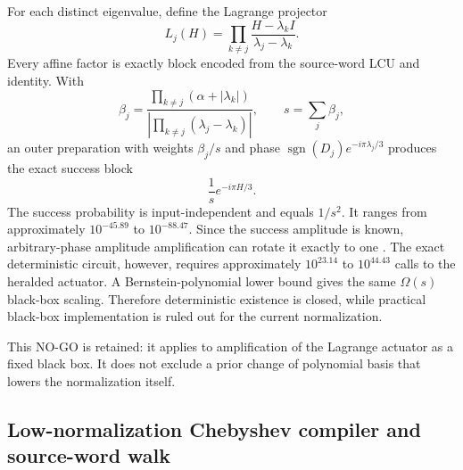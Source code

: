 \documentclass[11pt]{article}
\theoremstyle{definition}
\theoremstyle{remark}
\begin{document}
For each distinct eigenvalue, define the Lagrange projector
\begin{equation}
 L_j(H)=\prod_{k\ne j}\frac{H-\lambda_kI}{\lambda_j-\lambda_k}.
\end{equation}
Every affine factor is exactly block encoded from the source-word LCU and identity. With
\begin{equation}
 \beta_j=
 \frac{\prod_{k\ne j}(\alpha+|\lambda_k|)}
 {|\prod_{k\ne j}(\lambda_j-\lambda_k)|},\qquad
 s=\sum_j\beta_j,
\end{equation}
an outer preparation with weights $\beta_j/s$ and phase
$\operatorname{sgn}(D_j)e^{-i\pi\lambda_j/3}$ produces the exact success block
\begin{equation}
 \frac1s e^{-i\pi H/3}.
\end{equation}
The success probability is input-independent and equals $1/s^2$. It ranges from approximately $10^{-45.89}$ to $10^{-88.47}$. Since the success amplitude is known, arbitrary-phase amplitude amplification can rotate it exactly to one \cite{hoyer2000,brassard2002}. The exact deterministic circuit, however, requires approximately $10^{23.14}$ to $10^{44.43}$ calls to the heralded actuator. A Bernstein-polynomial lower bound gives the same $\Omega(s)$ black-box scaling. Therefore deterministic existence is closed, while practical black-box implementation is ruled out for the current normalization.

This NO-GO is retained: it applies to amplification of the Lagrange actuator as a fixed black box. It does not exclude a prior change of polynomial basis that lowers the normalization itself.

\subsection{Low-normalization Chebyshev compiler and source-word walk}
\end{document}
